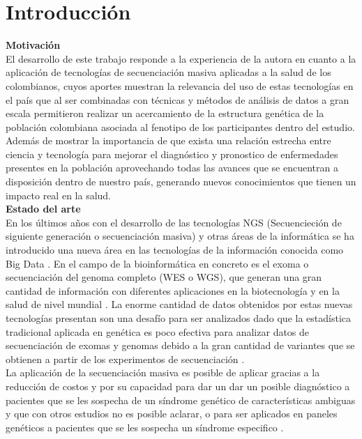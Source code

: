 \chapter{Introducci\'{o}n}

\textbf{Motivación}\\

El desarrollo de este trabajo responde a la experiencia de la autora en cuanto a la aplicación de tecnologías de secuenciación masiva aplicadas a la salud de los colombianos, cuyos aportes muestran  la relevancia del uso de estas tecnologías en el país que al ser combinadas con técnicas y métodos de análisis de datos a gran escala permitieron realizar un acercamiento de la estructura genética de la población colombiana asociada al fenotipo de los participantes dentro del estudio.\\

Además de mostrar la importancia de que exista una relación estrecha entre ciencia y tecnología para mejorar el diagnóstico y pronostico de enfermedades presentes en la población aprovechando todas las avances que se encuentran a disposición dentro de nuestro país, generando nuevos conocimientos que tienen un impacto real en la salud.\\

\textbf{Estado del arte}\\

En los últimos años con el desarrollo de las tecnologías NGS (Secuencieción de siguiente generación o secuenciación masiva) y otras áreas de la informática se ha introducido una nueva área en las tecnologías de la información conocida como Big Data \cite{Mohammed2014}. En el campo de la bioinformática en concreto es el exoma o secuenciación del genoma completo (WES o WGS), que generan una gran cantidad de información con diferentes aplicaciones en la biotecnología y en la  salud de nivel mundial \cite{Hwang2015}. La enorme cantidad de datos obtenidos por estas nuevas tecnologías presentan son una desafío para ser analizados dado que la estadística tradicional aplicada en genética es poco efectiva para analizar datos de secuenciación de exomas y genomas debido a la gran cantidad de variantes que se obtienen a partir de los experimentos de secuenciación \cite{Wu2014,Mohammed2014}.\\

La aplicación de la secuenciación masiva es posible de aplicar gracias a  la reducción de costos y por su capacidad para dar un dar un posible diagnóstico a pacientes que se les sospecha de un síndrome genético de características ambiguas y que con otros estudios no es posible aclarar, o para ser aplicados en paneles genéticos a pacientes que se les sospecha un síndrome especifico \cite{Hegde2017}.\\

